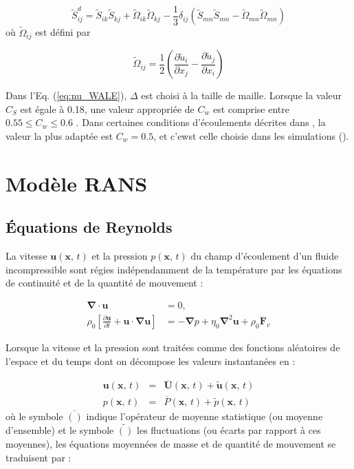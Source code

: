 \[
\tilde{S}_{ij}^{d}=\tilde{S}_{ik}\tilde{S}_{kj}+\tilde{\Omega}_{ik}\tilde{\Omega}_{kj}-\frac{1}{3}\delta_{ij}\left(\tilde{S}_{mn}\tilde{S}_{mn}-\tilde{\Omega}_{mn}\tilde{\Omega}_{mn}\right)
\]
o\`u $\tilde{\Omega}{}_{ij}$ est d\'efini par 

\[
\tilde{\Omega}_{ij}=\frac{1}{2}\left(\frac{\partial\tilde{u}_{i}}{\partial x_{j}}-\frac{\partial\tilde{u}_{j}}{\partial x_{i}}\right)
\]


Dans l'Eq. (\ref{eq:nu_WALE}), $\Delta$ est choisi \`a la taille de
maille. Lorsque la valeur $C_{S}$ est \'egale \`a 0.18, une valeur appropri\'ee
de $C_{w}$ est comprise entre $0.55\leq C_{w}\leq0.6$ \cite[p. 170]{Nicoud-Ducros_LES-WALE_FTC1999}.
Dans certaines conditions d'\'ecoulements d\'ecrites dans \cite[sec 3.1]{Nicoud-Ducros_LES-WALE_FTC1999},
la valeur la plus adapt\'ee est $C_{w}=0.5$, et c'ewst celle choisie
dans les simulations (\cite[pp. 191 and 192]{Nicoud-Ducros_LES-WALE_FTC1999}).


\chapter{\label{sec:Modele-RANS}Mod\`ele RANS}

\section{\'Equations de Reynolds}

La vitesse $\mathbf{u}(\mathbf{x},\,t)$ et la pression $p(\mathbf{x},\,t)$
du champ d'\'ecoulement d'un fluide incompressible sont r\'egies ind\'ependamment
de la temp\'erature par les \'equations de continuit\'e et de la quantit\'e
de mouvement :

\begin{align}
\boldsymbol{\nabla}\cdot\mathbf{u} & =0,\label{eq:ContinuiteMP-2}\\
\rho_{0}\left[\frac{\partial\mathbf{u}}{\partial t}+\mathbf{u}\cdot\boldsymbol{\nabla}\mathbf{u}\right] & =-\boldsymbol{\nabla}p+\eta_{0}\boldsymbol{\nabla}^{2}\mathbf{u}+\rho_{0}\mathbf{F}_{v}\label{eq:DBF-1-2}
\end{align}


Lorsque la vitesse et la pression sont trait\'ees comme des fonctions
al\'eatoires de l'espace et du temps dont on d\'ecompose les valeurs instantan\'ees
en :

\begin{eqnarray*}
\mathbf{u}(\mathbf{x},\,t) & = & \overline{\mathbf{U}}(\mathbf{x},\,t)+\tilde{\mathbf{u}}(\mathbf{x},\,t)\\
p(\mathbf{x},\,t) & = & \overline{P}(\mathbf{x},\,t)+\tilde{p}(\mathbf{x},\,t)
\end{eqnarray*}
o\`u le symbole $\overline{()}$ indique l'op\'erateur de moyenne statistique
(ou moyenne d'ensemble) et le symbole $\tilde{()}$ les fluctuations
(ou \'ecarts par rapport \`a ces moyennes), les \'equations moyenn\'ees de
masse et de quantit\'e de mouvement se traduisent par \cite[sec 4 p 73--76]{Book_Chassaing}
:

